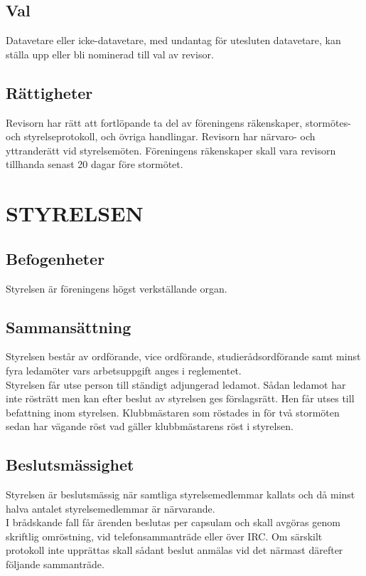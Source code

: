 \documentclass[a4paper]{article}
\begin{document}
{{  \subsection{Val}
  Datavetare eller icke-datavetare, med undantag för utesluten datavetare, kan ställa upp eller bli nominerad till val av revisor.
  \subsection{Rättigheter}
  Revisorn har rätt att fortlöpande ta del av föreningens räkenskaper, stormötes- och styrelseprotokoll, och övriga handlingar. Revisorn har närvaro- och yttranderätt vid styrelsemöten. Föreningens räkenskaper skall vara revisorn tillhanda senast 20 dagar före stormötet.}
\section{STYRELSEN}
{\subsection{Befogenheter}
  Styrelsen är föreningens högst verkställande organ.
  \subsection{Sammansättning}
  Styrelsen består av ordförande, vice ordförande, studierådsordförande samt minst fyra ledamöter vars arbetsuppgift anges i reglementet.\\
  Styrelsen får utse person till ständigt adjungerad ledamot. Sådan ledamot har inte rösträtt men kan efter beslut av styrelsen ges förslagsrätt. Hen får utses till befattning inom styrelsen. Klubbmästaren som röstades in för två stormöten sedan har vägande röst vad gäller klubbmästarens röst i styrelsen.
  \subsection{Beslutsmässighet}
  Styrelsen är beslutsmässig när samtliga styrelsemedlemmar kallats och då minst halva antalet styrelsemedlemmar är närvarande.\\
  I brådskande fall får ärenden beslutas per capsulam och skall avgöras genom skriftlig omröstning, vid telefonsammanträde eller över IRC. Om särskilt protokoll inte upprättas skall sådant beslut anmälas vid det närmast därefter följande sammanträde.
}}
\end{document}
